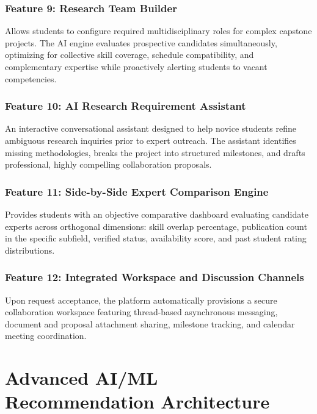\documentclass[11pt,a4paper]{article}
\begin{document}
\subsubsection{Feature 9: Research Team Builder}
Allows students to configure required multidisciplinary roles for complex capstone projects. The AI engine evaluates prospective candidates simultaneously, optimizing for collective skill coverage, schedule compatibility, and complementary expertise while proactively alerting students to vacant competencies.

\subsubsection{Feature 10: AI Research Requirement Assistant}
An interactive conversational assistant designed to help novice students refine ambiguous research inquiries prior to expert outreach. The assistant identifies missing methodologies, breaks the project into structured milestones, and drafts professional, highly compelling collaboration proposals.

\subsubsection{Feature 11: Side-by-Side Expert Comparison Engine}
Provides students with an objective comparative dashboard evaluating candidate experts across orthogonal dimensions: skill overlap percentage, publication count in the specific subfield, verified status, availability score, and past student rating distributions.

\subsubsection{Feature 12: Integrated Workspace and Discussion Channels}
Upon request acceptance, the platform automatically provisions a secure collaboration workspace featuring thread-based asynchronous messaging, document and proposal attachment sharing, milestone tracking, and calendar meeting coordination.

\section[Advanced AI/ML Architecture]{Advanced AI/ML Recommendation Architecture}
\label{sec:aiml_engine}
\end{document}
